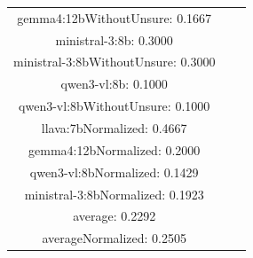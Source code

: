 \documentclass[a4paper]{article}
\begin{document}
\begin{tabular}{ccc}
gemma4:12bWithoutUnsure: 0.1667 \\ ministral-3:8b: 0.3000 \\ ministral-3:8bWithoutUnsure: 0.3000 \\ qwen3-vl:8b: 0.1000 \\ qwen3-vl:8bWithoutUnsure: 0.1000 \\ llava:7bNormalized: 0.4667 \\ gemma4:12bNormalized: 0.2000 \\ qwen3-vl:8bNormalized: 0.1429 \\ ministral-3:8bNormalized: 0.1923 \\ average: 0.2292 \\ averageNormalized: 0.2505 \end{minipage}\\
\end{tabular}

\vspace{5mm}
\end{document}

